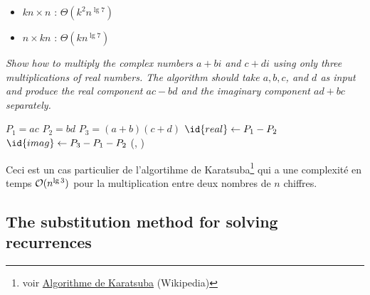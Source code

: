 \begin{description}
\begin{exrev}
    \end{exrev}


    \begin{ex}   %
      \begin{itemize}
        \item $kn \times n$ : $\Theta(k^2 n^{\lg 7})$
        \item $n \times kn$ : $\Theta(kn^{\lg 7})$
      \end{itemize}
    \end{ex}

   {\itshape Show how to multiply the complex numbers $a + bi$ and $c + di$ using only three multiplications of real numbers. The algorithm should take $a, b, c$, and $d$ as input and produce the real component $ac-bd$ and the imaginary component $ad + bc$ separately.}
    \begin{ex}
      \begin{codebox}%
        \li $P_1 = ac$
        \li $P_2 = bd$
        \li $P_3 = (a+b)(c+d)$
        \li $\id{real} \gets P_1 - P_2$
        \li $\id{imag} \gets P_3-P_1-P_2$
        \li \Return (, )
      \end{codebox}

      Ceci est un cas particulier de l'algortihme de Karatsuba\footnote{voir \href{https://en.wikipedia.org/wiki/Karatsuba_algorithm}{Algorithme de Karatsuba} (Wikipedia)} qui a une complexité en temps $\mathcal{O}(n^{\lg 3})$ pour la multiplication entre deux nombres de $n$ chiffres.

    \end{ex}

\end{description}

\subsection{The substitution method for solving recurrences}

